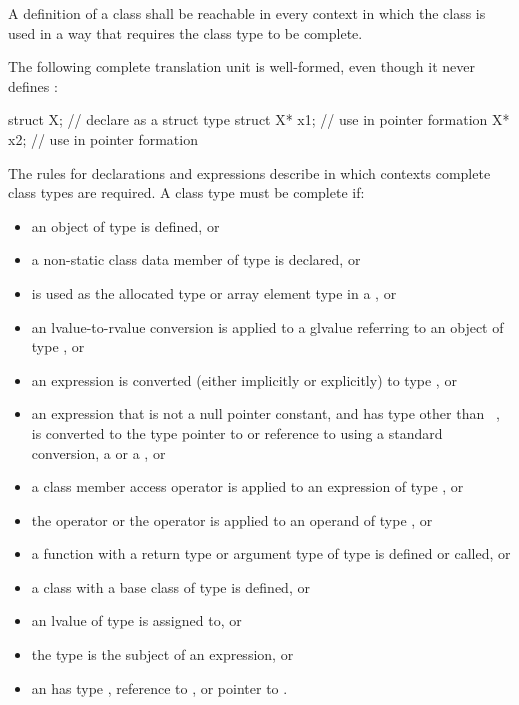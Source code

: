 \pnum
{}%
A definition of a class shall be reachable in every context in which
the class is used in a way that requires the class type to be complete.
\begin{example}
The following complete translation unit is well-formed,
even though it never defines :
\begin{codeblock}
struct X;                       // declare  as a struct type
struct X* x1;                   // use  in pointer formation
X* x2;                          // use  in pointer formation
\end{codeblock}
\end{example}
\begin{note}
The rules for declarations and expressions
describe in which contexts complete class types are required. A class
type  must be complete if:
\begin{itemize}
\item an object of type  is defined, or
\item a non-static class data member of type  is
declared, or
\item {} is used as the allocated type or array element type in a
, or
\item an lvalue-to-rvalue conversion is applied to
a glvalue referring
to an object of type , or
\item an expression is converted (either implicitly or explicitly) to
type , or
\item an expression that is not a null pointer constant, and has type
other than \cv{}~, is converted to the type pointer to 
or reference to  using a standard conversion,
a  or
a , or
\item a class member access operator is applied to an expression of type
, or
\item the  operator or the
 operator is applied to an operand of
type , or
\item a function with a return type or argument type of type 
is defined or called, or
\item a class with a base class of type  is
defined, or
\item an lvalue of type  is assigned to, or
\item the type  is the subject of an
 expression, or
\item an  has type , reference to
, or pointer to .
\end{itemize}
\end{note}

